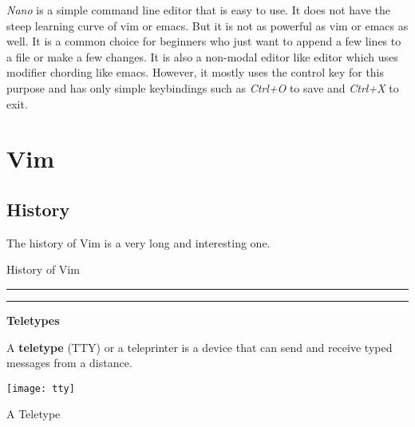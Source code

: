 \textit{Nano} is a simple command line editor that is easy to use.
It does not have the steep learning curve of vim or emacs.
But it is not as powerful as vim or emacs as well.
It is a common choice for beginners who just want to append a few lines to a file or make a few changes.
It is also a non-modal editor like editor which uses modifier chording like emacs.
However, it mostly uses the control key for this purpose and has only simple
keybindings such as \textit{Ctrl+O} to save and \textit{Ctrl+X} to exit.

\section{Vim}

\subsection{History}

The history of Vim is a very long and interesting one.

\begin{table}[h!]
\caption{History of Vim}
\centering
\begin{minipage}[t]{.7\linewidth}
\color{gray}
\rule{\linewidth}{1pt}
\bigskip
\rule{\linewidth}{1pt}
\end{minipage}
\end{table}

\textbf{Teletypes}

\begin{definition}
A \textbf{teletype} (TTY) or a teleprinter is a device that can send and receive typed messages from a distance.
\end{definition}

\begin{marginfigure}
  \texttt{[image: tty]}
  \caption{A Teletype}
\end{marginfigure}

